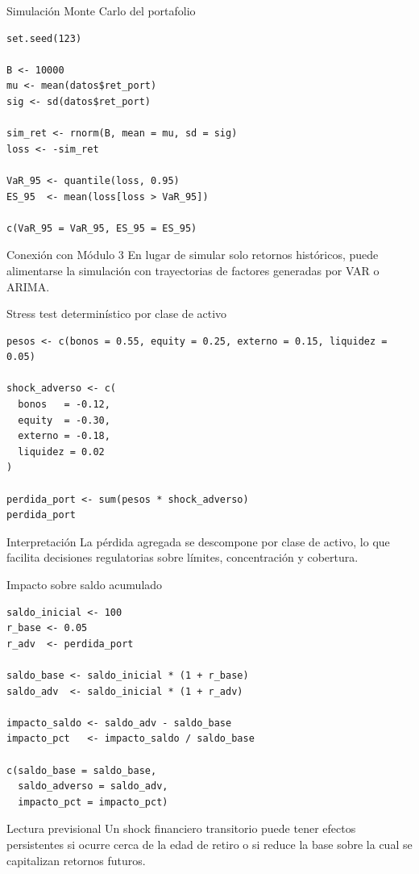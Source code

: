 \documentclass[aspectratio=169,11pt]{beamer}
\begin{document}
\begin{frame}[fragile]{Simulación Monte Carlo del portafolio}
\begin{lstlisting}[style=Rstyle]
set.seed(123)

B <- 10000
mu <- mean(datos$ret_port)
sig <- sd(datos$ret_port)

sim_ret <- rnorm(B, mean = mu, sd = sig)
loss <- -sim_ret

VaR_95 <- quantile(loss, 0.95)
ES_95  <- mean(loss[loss > VaR_95])

c(VaR_95 = VaR_95, ES_95 = ES_95)
\end{lstlisting}

\begin{block}{Conexión con Módulo 3}
En lugar de simular solo retornos históricos, puede alimentarse la simulación con trayectorias de factores generadas por VAR o ARIMA.
\end{block}
\end{frame}

\begin{frame}[fragile]{Stress test determinístico por clase de activo}
\begin{lstlisting}[style=Rstyle]
pesos <- c(bonos = 0.55, equity = 0.25, externo = 0.15, liquidez = 0.05)

shock_adverso <- c(
  bonos   = -0.12,
  equity  = -0.30,
  externo = -0.18,
  liquidez = 0.02
)

perdida_port <- sum(pesos * shock_adverso)
perdida_port
\end{lstlisting}

\begin{alertblock}{Interpretación}
La pérdida agregada se descompone por clase de activo, lo que facilita decisiones regulatorias sobre límites, concentración y cobertura.
\end{alertblock}
\end{frame}

\begin{frame}[fragile]{Impacto sobre saldo acumulado}
\begin{lstlisting}[style=Rstyle]
saldo_inicial <- 100
r_base <- 0.05
r_adv  <- perdida_port

saldo_base <- saldo_inicial * (1 + r_base)
saldo_adv  <- saldo_inicial * (1 + r_adv)

impacto_saldo <- saldo_adv - saldo_base
impacto_pct   <- impacto_saldo / saldo_base

c(saldo_base = saldo_base,
  saldo_adverso = saldo_adv,
  impacto_pct = impacto_pct)
\end{lstlisting}

\begin{block}{Lectura previsional}
Un shock financiero transitorio puede tener efectos persistentes si ocurre cerca de la edad de retiro o si reduce la base sobre la cual se capitalizan retornos futuros.
\end{block}
\end{frame}
\end{document}
